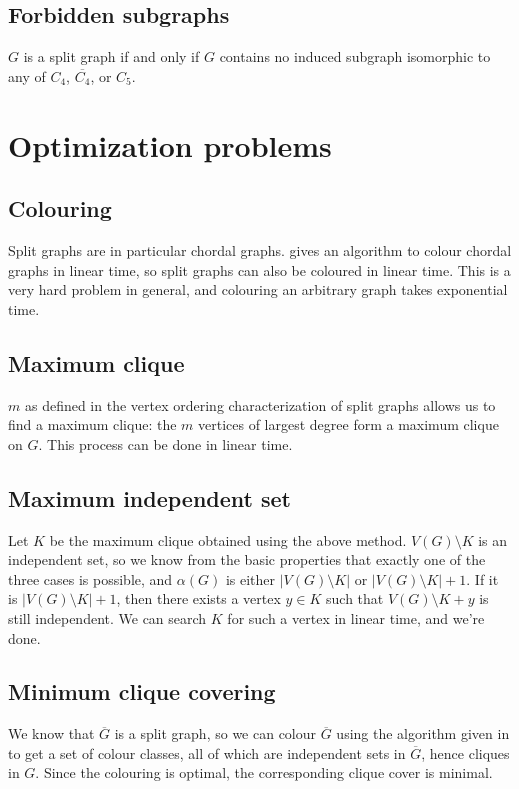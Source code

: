 \documentclass[11pt]{article}
\begin{document}
\subsection{Forbidden subgraphs}
$G$ is a split graph if and only if $G$ contains no induced subgraph
isomorphic to any of $C_4$, $\overline{C_4}$, or $C_5$.\cite{Hammer}


\section{Optimization problems}
\subsection{Colouring}
Split graphs are in particular chordal graphs. \cite{Golumbic} gives an
algorithm to colour chordal graphs in linear time, so split graphs can also be
coloured in linear time. This is a very hard problem in general, and colouring
an arbitrary graph takes exponential time.


\subsection{Maximum clique}
$m$ as defined in the vertex ordering characterization of split graphs allows
us to find a maximum clique: the $m$ vertices of largest degree form a maximum
clique on $G$. This process can be done in linear time.


\subsection{Maximum independent set}
Let $K$ be the maximum clique obtained using the above method.
$V(G)\setminus K$ is an independent set, so we know from the basic properties
that exactly one of the three cases is possible, and $\alpha(G)$ is either
$|V(G)\setminus K|$ or $|V(G)\setminus K|+1$. If it is $|V(G)\setminus K|+1$,
then there exists a vertex $y\in K$ such that $V(G)\setminus K + y$ is still
independent. We can search $K$ for such a vertex in linear time, and we're
done.


\subsection{Minimum clique covering}
We know that $\overline{G}$ is a split graph, so we can colour $\overline{G}$
using the algorithm given in \cite{Golumbic} to get a set of colour classes,
all of which are independent sets in $\overline{G}$, hence cliques in $G$.
Since the colouring is optimal, the corresponding clique cover is minimal.




\end{document}
